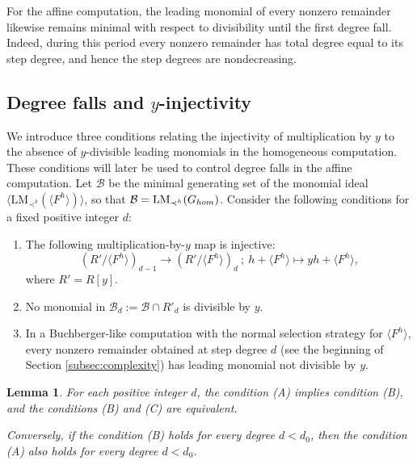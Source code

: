 \documentclass{article}
\newtheorem{lemma}[theorem]{Lemma}
\theoremstyle{definition}
\theoremstyle{plain}
\theoremstyle{plain}
\theoremstyle{plain}
\theoremstyle{plain}
\numberwithin{equation}{subsection}
\begin{document}
For the affine computation, the leading monomial of every nonzero remainder likewise remains minimal with respect to divisibility until the first degree fall.
Indeed, during this period every nonzero remainder has total degree equal to its step degree, and hence the step degrees are nondecreasing.

\subsection{Degree falls and $y$-injectivity}\label{subsec:degfall}

We introduce three conditions relating the injectivity of multiplication by $y$ to the absence of $y$-divisible leading monomials in the homogeneous computation.
These conditions will later be used to control degree falls in the affine computation.
Let $\mathcal{B}$ be the minimal generating set of the monomial ideal $\langle \mathrm{LM}_{\prec^h}(\langle F^h \rangle)\rangle$, so that $\mathcal{B} = \mathrm{LM}_{\prec^h}(G_{\rm hom})$.
Consider the following conditions for a fixed positive integer $d$:
\begin{enumerate}
\item[(A)] The following multiplication-by-$y$ map is injective:
    \begin{equation}\label{eq:mult-y}
    (R'/\langle F^h \rangle)_{d-1}\longrightarrow (R'/\langle F^h \rangle)_{d} \ ; \ h+\langle F^h\rangle \longmapsto yh+\langle F^h \rangle,
    \end{equation}
    where $R'=R[y]$.
\item[(B)] No monomial in $\mathcal B_d:=\mathcal{B}\cap R'_d$ is divisible by $y$.
\item[(C)] In a Buchberger-like computation with the normal selection strategy for $\langle F^h\rangle$, every nonzero remainder obtained at step degree $d$ (see the beginning of Section \ref{subsec:complexity}) has leading monomial not divisible by $y$.
\end{enumerate}

\begin{lemma}\label{lem:char-no-y}
For each positive integer $d$, the condition {\rm (A)} implies condition {\rm (B)}, and the conditions {\rm (B)} and {\rm (C)} are equivalent.

Conversely, if the condition {\rm (B)} holds for every degree $d<d_0$, then the condition {\rm (A)} also holds for every degree $d<d_0$.
\end{lemma}
\end{document}
